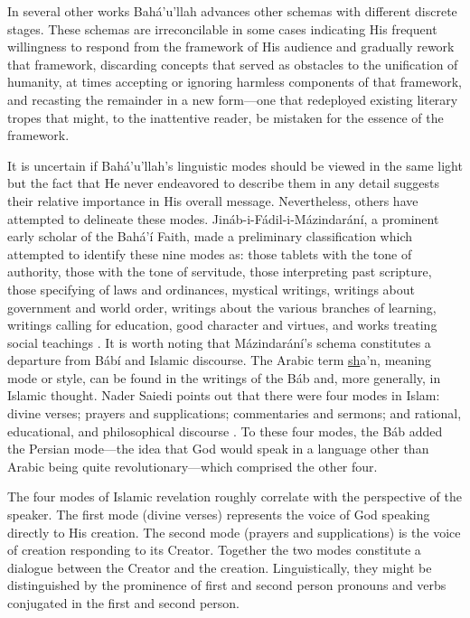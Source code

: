 \documentclass[12pt, oneside]{report}
\begin{document}
In several other works Bah\'{a}'u'llah advances other schemas with different discrete stages.
These schemas are irreconcilable in some cases indicating His frequent willingness to respond from the framework of His audience and gradually rework that framework, discarding concepts that served as obstacles to the unification of humanity, at times accepting or ignoring harmless components of that framework, and recasting the remainder in a new form---one that redeployed existing literary tropes that might, to the inattentive reader, be mistaken for the essence of the framework.
\par
It is uncertain if Bah\'{a}'u'llah's linguistic modes should be viewed in the same light but the fact that He never endeavored to describe them in any detail suggests their relative importance in His overall message.
Nevertheless, others have attempted to delineate these modes.
Jin\'{a}b-i-F\'{a}dil-i-M\'{a}zindar\'{a}n\'{i}, a prominent early scholar of the Bah\'{a}'\'{i} Faith, made a preliminary classification which attempted to identify these nine modes as: those tablets with the tone of authority, those with the tone of servitude, those interpreting past scripture, those specifying of laws and ordinances, mystical writings, writings about government and world order, writings about the various branches of learning, writings calling for education, good character and virtues, and works treating social teachings \cite{taherzadeh_revelation_1975}.
It is worth noting that M\'{a}zindar\'{a}n\'{i}'s schema constitutes a departure from B\'{a}b\'{i} and Islamic discourse.
The Arabic term \underline{sh}a'n, meaning mode or style, can be found in the writings of the B\'{a}b and, more generally, in Islamic thought.
Nader Saiedi points out that there were four modes in Islam: divine verses; prayers and supplications; commentaries and sermons; and rational, educational, and philosophical discourse \cite{saiedi_gate_2008}.
To these four modes, the B\'{a}b added the Persian mode---the idea that God would speak in a language other than Arabic being quite revolutionary---which comprised the other four.
\par
The four modes of Islamic revelation roughly correlate with the perspective of the speaker.
The first mode (divine verses) represents the voice of God speaking directly to His creation.
The second mode (prayers and supplications) is the voice of creation responding to its Creator.
Together the two modes constitute a dialogue between the Creator and the creation.
Linguistically, they might be distinguished by the prominence of first and second person pronouns and verbs conjugated in the first and second person.
\end{document}
